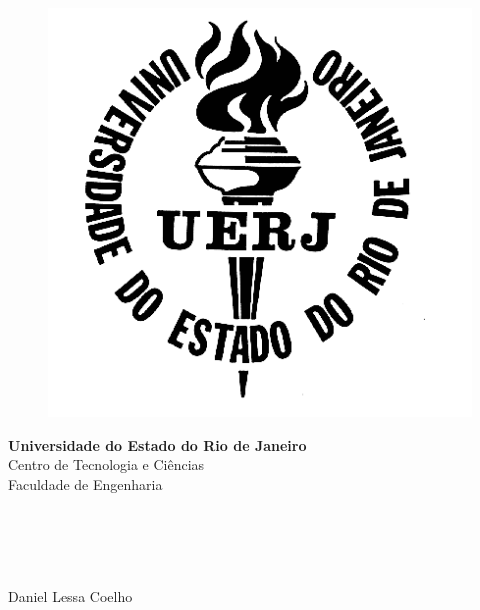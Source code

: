 \begin{titlepage}
\begin{center}

	\vspace{-0.5cm}

  \begin{figure}[hbt!]
		\begin{flushleft}
		   \includegraphics[scale=0.3]{./01_Pre_textuais/logo_uerj_pb.png}
		\end{flushleft}
	\end{figure}
	\vspace{-4cm}

  \hspace{2cm}\large{\textbf{Universidade do Estado do Rio de Janeiro}}\\
  \hspace{2cm}\large{Centro de Tecnologia e Ciências}\\
  \hspace{2cm}\large{Faculdade de Engenharia}\\

  \hspace{2cm}\large{}\\
  \hspace{2cm}\large{}\\
  \hspace{2cm}\large{}\\
  \hspace{2cm}\large{}\\

  \par
  {\large{Daniel Lessa Coelho}}


\end{center}
\end{titlepage}
